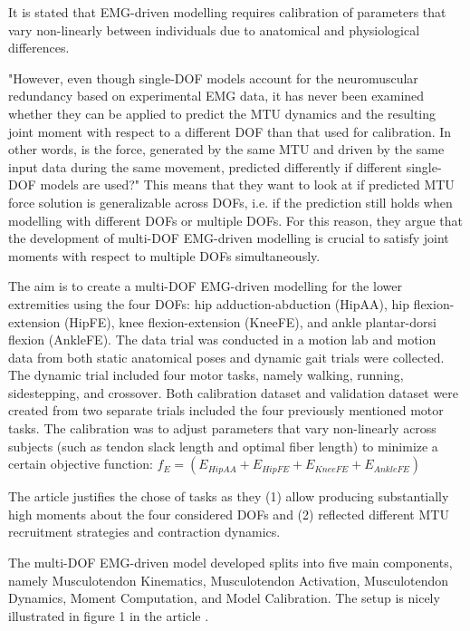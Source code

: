 It is stated that \ac{EMG}-driven modelling requires calibration of parameters that vary non-linearly between individuals due to anatomical and physiological differences.

"However, even though single-DOF models account for
the neuromuscular redundancy based on experimental \ac{EMG} data,
it has never been examined whether they can be applied to predict
the MTU dynamics and the resulting joint moment with respect to
a different DOF than that used for calibration. In other words, is
the force, generated by the same MTU and driven by the same
input data during the same movement, predicted differently if
different single-DOF models are used?" \cite[p. 2]{Sartori2012a}
This means that they want to look at if predicted MTU force solution is generalizable across DOFs, i.e. if the prediction still holds when modelling with different DOFs or multiple DOFs. For this reason, they argue that the development of multi-DOF \ac{EMG}-driven modelling is crucial to satisfy joint moments with respect to multiple DOFs simultaneously. 

The aim is to create a multi-DOF \ac{EMG}-driven modelling for the lower extremities using the four DOFs: hip adduction-abduction (HipAA), hip flexion-extension (HipFE), knee flexion-extension (KneeFE), and ankle plantar-dorsi flexion (AnkleFE).
The data trial was conducted in a motion lab and motion data from both static anatomical poses and dynamic gait trials were collected. The dynamic trial included four motor tasks, namely walking, running, sidestepping, and crossover. Both calibration dataset and validation dataset were created from two separate trials included the four previously mentioned motor tasks. The calibration was to adjust parameters that vary non-linearly across subjects (such as tendon slack length and optimal fiber length) to minimize a certain objective function: $f_E = \left( E_{HipAA} + E_{HipFE} + E_{KneeFE} + E_{AnkleFE} \right)$

The article justifies the chose of tasks as they (1) allow producing substantially high moments about the four considered DOFs and (2) reflected different MTU recruitment strategies and contraction dynamics.

The multi-DOF \ac{EMG}-driven model developed splits into five main components, namely Musculotendon Kinematics, Musculotendon Activation, Musculotendon Dynamics, Moment Computation, and Model Calibration. The setup is nicely illustrated in figure 1 in the article \cite[Fig. 1]{Sartori2012a}.

